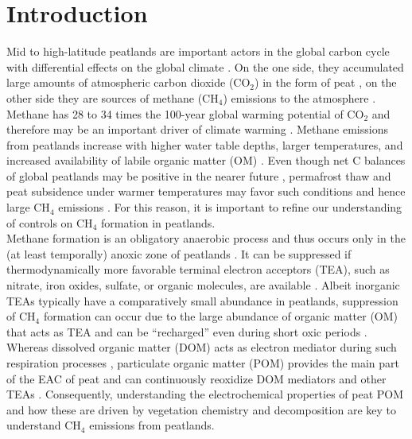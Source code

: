 \documentclass[draft,linenumbers]{agujournal2018}
\begin{document}
\section{Introduction}

Mid to high-latitude peatlands are important actors in the global carbon
cycle with differential effects on the global climate
\citep{Frolking.2011}. On the one side, they accumulated large amounts
of atmospheric carbon dioxide (CO\(_2\)) in the form of peat
\citep{Limpens.2008}, on the other side they are sources of methane
(CH\(_4\)) emissions to the atmosphere
\citep{Limpens.2008, Frolking.2011}.\\
Methane has 28 to 34 times the 100-year global warming potential of
CO\(_2\) and therefore may be an important driver of climate warming
\citep{Myhre.2013}. Methane emissions from peatlands increase with
higher water table depths, larger temperatures, and increased
availability of labile organic matter (OM)
\citep{Moore.1989, Yavitt.1997, Limpens.2008}. Even though net C
balances of global peatlands may be positive in the nearer future
\citep{Chaudhary.2020}, permafrost thaw and peat subsidence under warmer
temperatures may favor such conditions and hence large CH\(_4\)
emissions \citep{Anisimov.2007, Koven.2011, Frolking.2011}. For this
reason, it is important to refine our understanding of controls on
CH\(_4\) formation in peatlands.\\
Methane formation is an obligatory anaerobic process and thus occurs
only in the (at least temporally) anoxic zone of peatlands
\citep{Limpens.2008}. It can be suppressed if thermodynamically more
favorable terminal electron acceptors (TEA), such as nitrate, iron
oxides, sulfate, or organic molecules, are available
\citep{Blodau.2011, Klupfel.2014, Gao.2019}. Albeit inorganic TEAs
typically have a comparatively small abundance in peatlands, suppression
of CH\(_4\) formation can occur due to the large abundance of organic
matter (OM) that acts as TEA \citep{Gao.2019} and can be ``recharged''
even during short oxic periods
\citep{Klupfel.2014, Lau.2016, Walpen.2018b}. Whereas dissolved organic
matter (DOM) acts as electron mediator during such respiration processes
\citep{Lau.2016, Gao.2019}, particulate organic matter (POM) provides
the main part of the EAC of peat and can continuously reoxidize DOM
mediators and other TEAs \citep{Gao.2019, Blodau.2007}. Consequently,
understanding the electrochemical properties of peat POM and how these
are driven by vegetation chemistry and decomposition are key to
understand CH\(_4\) emissions from peatlands.\\
\end{document}
